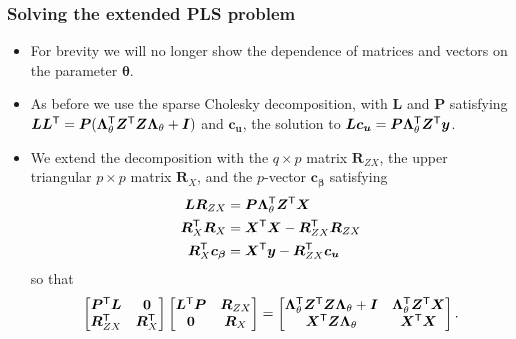 \documentclass[dvipsnames,pdflatex,beamer]{beamer}
\newcommand{\bLt}{\ensuremath{\bm\Lambda_\theta}}
\begin{document}
\begin{frame}
  \frametitle{Solving the extended PLS problem}
  \begin{itemize}
  \item For brevity we will no longer show the dependence of matrices
    and vectors on the parameter $\bm\theta$.
  \item As before we use the sparse Cholesky decomposition, with $\bm
    L$ and $\bm P$ satisfying $\bm L\bm L\trans=\bm P(\bLt\trans\bm Z\trans\bm
    Z\bLt+\bm I)$ and $\bm c_{\bm u}$, the solution to $\bm L\bm c_{\bm
      u}=\bm P\bLt\trans\bm Z\trans\bm y$.
  \item We extend the decomposition with the $q\times p$ matrix $\bm
    R_{ZX}$, the upper triangular $p\times p$ matrix $\bm R_X$, and
    the $p$-vector $\bm c_{\bm\beta}$ satisfying
    \begin{align*}
      \bm L\bm R_{ZX}&=\bm P\bLt\trans\bm Z\trans\bm X\\
      \bm R_X\trans\bm R_X&=\bm X\trans\bm X-\bm R_{ZX}\trans\bm R_{ZX}\\
      \bm R_X\trans\bm c_{\bm\beta}&=\bm X\trans\bm y-\bm
      R_{ZX}\trans\bm c_{\bm u}
    \end{align*}
    so that
    \begin{displaymath}
      \begin{bmatrix}
        \bm P\trans\bm L& \bm 0\\
        \bm R_{ZX}\trans & \bm R_X\trans
      \end{bmatrix}
      \begin{bmatrix}
        \bm L\trans\bm P & \bm R_{ZX}\\
        \bm 0            & \bm R_X
      \end{bmatrix}=
      \begin{bmatrix}
        \bLt\trans\bm Z\trans\bm Z\bLt+\bm I & \bLt\trans\bm Z\trans\bm X\\
        \bm X\trans\bm Z\bLt       & \bm X\trans\bm X
      \end{bmatrix} .
    \end{displaymath}
  \end{itemize}
\end{frame}
\end{document}
